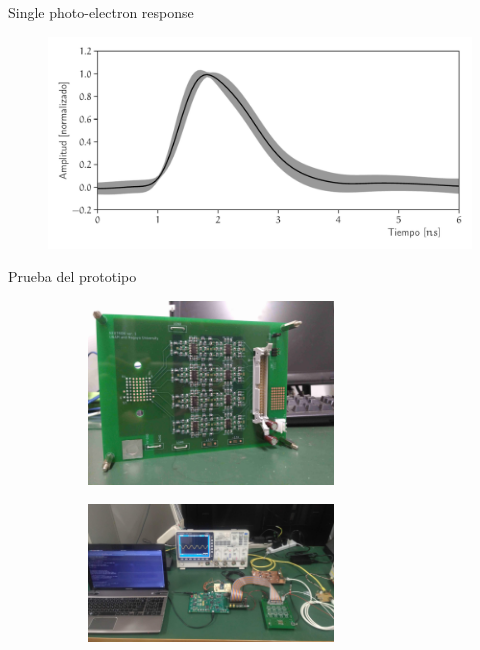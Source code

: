 \documentclass[spanish,aspectratio=169]{beamer}
\begin{document}
\begin{frame}{Single photo-electron response}

\begin{figure}
        \centering
        \includegraphics[width=\textwidth]{sphe-signal.pdf}
\end{figure}

\end{frame}

\begin{frame}{Prueba del prototipo}

\begin{figure}
        \centering
        \begin{subfigure}[b]{0.475\textwidth}
                \includegraphics[width=6.5cm]{neutron_ver1.jpg}
        \end{subfigure}
        \begin{subfigure}[b]{0.475\textwidth}
                \includegraphics[width=6.5cm]{complete-system.jpg}
        \end{subfigure}
\end{figure}

\end{frame}
\end{document}
